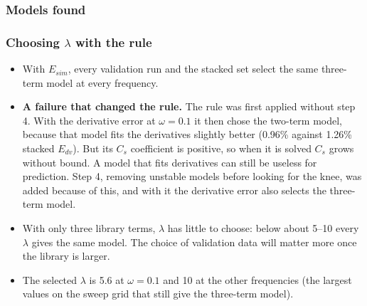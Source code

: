 \documentclass[11pt,a4paper]{article}
\begin{document}
\subsubsection{Models found}
\begin{table}[H]\centering\scriptsize\setlength{\tabcolsep}{3.5pt}
\resizebox{\textwidth}{!}{}
\caption{Models found in the $\lambda$ sweep ($10^{-6}$ to $10^3$, four values per decade) and their errors in \%. Each row is one candidate model; each validation column is that model's $E_{sim}$ on that run. $\infty$: the solution grows without bound. The empty model keeps $C_s$ at its starting value. Shaded: the selected model.}
\end{table}

\subsubsection{Choosing $\lambda$ with the rule}\label{sec:pde-select}
\begin{table}[H]\centering\scriptsize
\resizebox{\textwidth}{!}{}
\caption{Number of terms of the model selected by R4 for every choice of validation error. The selection used is $E_{sim}$, stacked.}
\end{table}
\begin{itemize}
  \item With $E_{sim}$, every validation run and the stacked set select the same three-term model at every frequency.
  \item \textbf{A failure that changed the rule.} The rule was first applied without step 4. With the derivative error at $\omega=0.1$ it then chose the two-term model, because that model fits the derivatives slightly better (0.96\% against 1.26\% stacked $E_{dv}$). But its $C_s$ coefficient is positive, so when it is solved $C_s$ grows without bound. A model that fits derivatives can still be useless for prediction. Step 4, removing unstable models before looking for the knee, was added because of this, and with it the derivative error also selects the three-term model.
  \item With only three library terms, $\lambda$ has little to choose: below about 5--10 every $\lambda$ gives the same model. The choice of validation data will matter more once the library is larger.
  \item The selected $\lambda$ is 5.6 at $\omega=0.1$ and 10 at the other frequencies (the largest values on the sweep grid that still give the three-term model).
\end{itemize}
\end{document}
